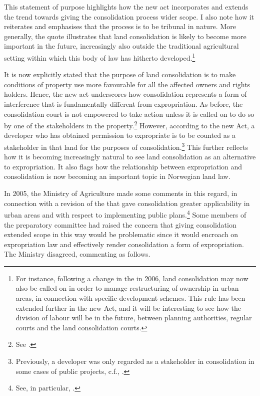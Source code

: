 This statement of purpose highlights how the new act incorporates and extends the trend towards giving the consolidation process wider scope. I also note how it reiterates and emphasises that the process is to be tribunal in nature. More generally, the quote illustrates that land consolidation is likely to become more important in the future, increasingly also outside the traditional agricultural setting within which this body of law has hitherto developed.\footnote{For instance, following a change in the \cite{lca79} in 2006, land consolidation may now also be called on in order to manage restructuring of ownership in urban areas, in connection with specific development schemes. This rule has been extended further in the new Act, and it will be interesting to see how the division of labour will be in the future, between planning authorities, regular courts and the land consolidation courts.}

It is now explicitly stated that the purpose of land consolidation is to make conditions of property use more favourable for all the affected owners and rights holders. Hence, the new act underscores how consolidation represents a form of interference that is fundamentally different from expropriation. As before, the consolidation court is not empowered to take action unless it is called on to do so by one of the stakeholders in the property.\footnote{See \cite[1-5]{lca13}.} However, according to the new Act, a developer who has obtained permission to expropriate is to be counted as a stakeholder in that land for the purposes of consolidation.\footnote{Previously, a developer was only regarded as a stakeholder in consolidation in some cases of public projects, c.f., \cite[5|88|88 a)]{lca79}.} This further reflects how it is becoming increasingly natural to see land consolidation as an alternative to expropriation. It also flags how the relationship between expropriation and consolidation is now becoming an important topic in Norwegian land law.

In 2005, the Ministry of Agriculture made some comments in this regard, in connection with a revision of the \cite{lca79} that gave consolidation greater applicability in urban areas and with respect to implementing public plans.\footnote{See, in particular, \cite[2 h-i)]{lca79}.} Some members of the preparatory committee had raised the concern that giving consolidation extended scope in this way would be problematic since it would encroach on expropriation law and effectively render consolidation a form of expropriation. The Ministry disagreed, commenting as follows.

